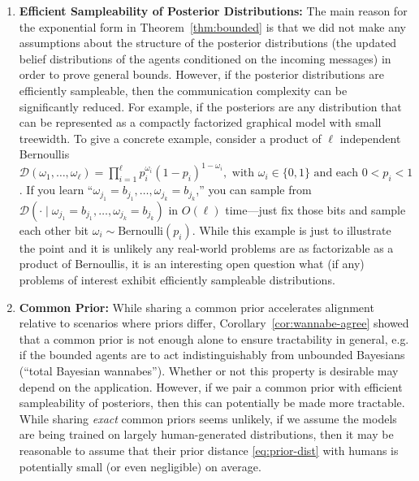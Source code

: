 \begin{enumerate}
\item \textbf{Efficient Sampleability of Posterior Distributions:} The main reason for the exponential form in Theorem~\ref{thm:bounded} is that we did not make any assumptions about the structure of the posterior distributions (the updated belief distributions of the agents conditioned on the incoming messages) in order to prove general bounds.
However, if the posterior distributions are efficiently sampleable, then the communication complexity can be significantly reduced.
For example, if the posteriors are any distribution that can be represented as a compactly factorized graphical model with small treewidth.
To give a concrete example, consider a product of $\ell$ independent Bernoullis $\mathcal{D}(\omega_1, \ldots, \omega_{\ell}) = \prod_{i=1}^{\ell} p_i^{\omega_i} (1 - p_i)^{1 - \omega_i}, \text{ with } \omega_i \in \{0, 1\} \text{ and each } 0 < p_i < 1$.
If you learn ``$\omega_{j_1} = b_{j_1}, \ldots, \omega_{j_k} = b_{j_k}$,'' you can sample from $\mathcal{D}(\cdot \mid \omega_{j_1} = b_{j_1}, \ldots, \omega_{j_k} = b_{j_k})$ in $O(\ell)$ time---just fix those bits and sample each other bit $\omega_i \sim \text{Bernoulli}(p_i)$.
While this example is just to illustrate the point and it is unlikely any real-world problems are as factorizable as a product of Bernoullis, it is an interesting open question what (if any) problems of interest exhibit efficiently sampleable distributions. 
\item \textbf{Common Prior:} While sharing a common prior accelerates alignment relative to scenarios where priors differ, Corollary~\ref{cor:wannabe-agree} showed that a common prior is not enough alone to ensure tractability in general, e.g. if the bounded agents are to act indistinguishably from unbounded Bayesians (``total Bayesian wannabes'').
Whether or not this property is desirable may depend on the application.
However, if we pair a common prior with efficient sampleability of posteriors, then this can potentially be made more tractable.
While sharing \emph{exact} common priors seems unlikely, if we assume the models are being trained on largely human-generated distributions, then it may be reasonable to assume that their prior distance \eqref{eq:prior-dist} with humans is potentially small (or even negligible) on average.


\end{enumerate}
